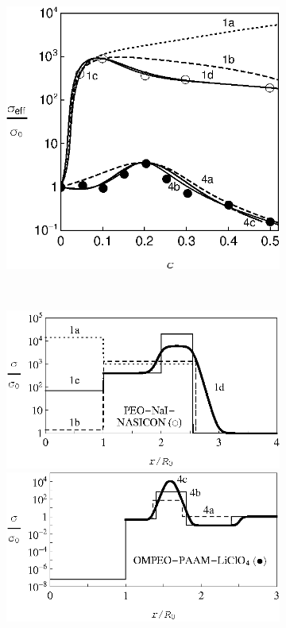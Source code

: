 \documentclass[twoside,a4paper,14pt]{vakaref}
\begin{document}
\begin{figure}[bt]
	\centering
	\begin{subfigure}[c]{0.45\textwidth}
		\includegraphics[width=\textwidth]{Fig3_PEO-NASICON_NaI_OMPEO-PAAM_LiClO4.eps}
		\caption{} \label{fig:OMPEO-LiClO4-a}
	\end{subfigure}%
	~
	\begin{subfigure}[c]{0.38\textwidth}
		\includegraphics[width=\textwidth]{Fig2_PEO-NaI_NASICON_Profile.eps}
		\includegraphics[width=\textwidth]{Fig3_OMPEO-PAAM_LiClO4_Profile.eps}

\end{subfigure}
\end{figure}
\end{document}

